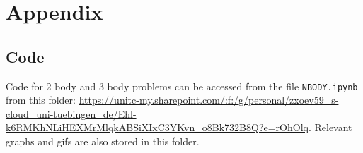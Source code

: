 \documentclass[12pt,a4paper]{article}
\begin{document}
\setcounter{secnumdepth}{0}

\printbibliography     
\appendix
\section{Appendix}
\subsection{Code}
\label{code}
  Code for 2 body and 3 body problems can be accessed from the file \texttt{NBODY.ipynb} from this folder: \url{https://unitc-my.sharepoint.com/:f:/g/personal/zxoev59_s-cloud_uni-tuebingen_de/Ehl-k6RMKhNLiHEXMrMlqkABSiXIxC3YKvn_o8Bk732B8Q?e=rOhOlq}. 
  Relevant graphs and gifs are also stored in this folder.
\end{document}
